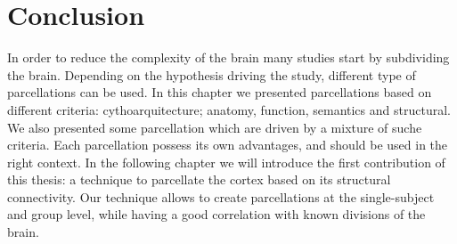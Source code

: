\section{Conclusion}
In order to reduce the complexity of the brain many studies start by subdividing
the brain. Depending on the hypothesis driving the study, different type
of parcellations can be used. In this chapter we presented parcellations based
on different criteria: cythoarquitecture; anatomy, function, semantics and
structural. We also presented some parcellation which are driven by a mixture
of suche criteria. Each parcellation possess its own advantages, and should be
used in the right context. In the following chapter we will introduce the
first contribution of this thesis: a technique to parcellate the cortex based
on its structural connectivity. Our technique allows to create parcellations
at the single-subject and group level, while having a good correlation with
known divisions of the brain.


\chapterbib
